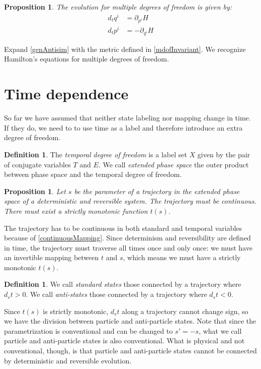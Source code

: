 \documentclass[aps,twocolumn,floatfix,nofootinbib]{revtex4}   %
\newtheorem{prop}[thm]{Proposition}
\theoremstyle{definition}
\newtheorem{defn}[thm]{Definition}
\begin{document}
\begin{prop}\label{mdofHam}
The evolution for multiple degrees of freedom is given by:
\begin{align*}
d_{t}q^i &= \partial_{p^i} H \\
d_{t}p^i &= - \partial_{q^i} H
\end{align*}
\end{prop}

Expand \ref{genAntisim} with the metric defined in \ref{mdofInvariant}. We recognize Hamilton's equations for multiple degrees of freedom\cite{classical_dynamics}.

\section{Time dependence}
So far we have assumed that neither state labeling nor mapping change in time. If they do, we need to to use time as a label and therefore introduce an extra degree of freedom.

\begin{defn}\label{tdof}
The \emph{temporal degree of freedom} is a label set $X$ given by the pair of conjugate variables $T$ and $E$. We call \emph{extended phase space} the outer product between phase space and the temporal degree of freedom.
\end{defn}

\begin{prop}\label{tdofMonotonic}
Let $s$ be the parameter of a trajectory in the extended phase space of a deterministic and reversible system. The trajectory must be continuous. There must exist a strictly monotonic function $t(s)$.
\end{prop}

The trajectory has to be continuous in both standard and temporal variables because of \ref{continuousMapping}. Since determinism and reversibility are defined in time, the trajectory must traverse all times once and only once: we must have an invertible mapping between $t$ and $s$, which means we must have a strictly monotonic $t(s)$.

\begin{defn}\label{tdofAntistates}
We call \emph{standard states} those connected by a trajectory where $d_{s}t>0$. We call \emph{anti-states} those connected by a trajectory where $d_{s}t<0$.
\end{defn}

Since $t(s)$ is strictly monotonic, $d_{s}t$ along a trajectory cannot change sign, so we have the division between particle and anti-particle states. Note that since the parametrization is conventional and can be changed to $s'=-s$, what we call particle and anti-particle states is also conventional. What is physical and not conventional, though, is that particle and anti-particle states cannot be connected by deterministic and reversible evolution.
\end{document}
